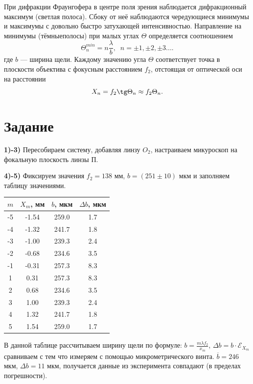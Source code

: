 \documentclass[a4paper,12pt]{extarticle}
\begin{document}
При дифракции Фраунгофера в центре поля зрения наблюдается дифракционный максимум (светлая полоса). Сбоку от неё наблюдаются чередующиеся минимумы и максимумы с довольно быстро затухающей интенсивностью. Направление на минимумы (тёмныеполосы) при малых углах $\Theta$ определяется соотношением
\begin{equation}
    \Theta^{min}_n = n \frac{\lambda}{b}, \;\; n = \pm1, \pm2, \pm3....
\end{equation}
где $b$ — ширина щели. Каждому значению угла $\Theta$ соответствует точка в плоскости объектива с фокусным расстоянием $f_2$, отстоящая от оптической оси на расстоянии
\begin{equation}
    X_n = f_2 \tg\Theta_n \approx f_2\Theta_n.
\end{equation}

\section*{Задание}
\textbf{1)-3)} Пересобираем систему, добавляя линзу $O_2$, настраиваем микуроскоп на фокальную плоскость линзы П. 

\textbf{4)-5)} Фиксируем значения $f_2 = 138$ мм, $b = (251\pm10)$ мкм и заполняем таблицу значениями. 

\begin{tabular}{|c|c|c|c|}
\hline
$m$  & $X_m$, мм & $b$, мкм & $\Delta b$, мкм \\ \hline
-5 & -1.54    & 259.0 & 1.7      \\ \hline
-4 & -1.32    & 241.7 & 1.8      \\ \hline
-3 & -1.00    & 239.3 & 2.4      \\ \hline
-2 & -0.68    & 234.6 & 3.5      \\ \hline
-1 & -0.31    & 257.3 & 8.3      \\ \hline
1  & 0.31     & 257.3 & 8.3      \\ \hline
2  & 0.68     & 234.6 & 3.5      \\ \hline
3  & 1.00     & 239.3 & 2.4      \\ \hline
4  & 1.32     & 241.7 & 1.8      \\ \hline
5  & 1.54     & 259.0 & 1.7      \\ \hline
\end{tabular}

В данной таблице рассчитываем ширину щели по формуле: $b = \frac{m \lambda f_2}{x_m}$, $\Delta b = b \cdot \mathcal{E}_{X_m}$ сравниваем с тем что измеряем с помощью микрометрического винта. $\overline{b} = 246$ мкм, $\Delta b = 11$ мкм, получается данные из эксперимента совпадают (в пределах погрешности).
\end{document}
